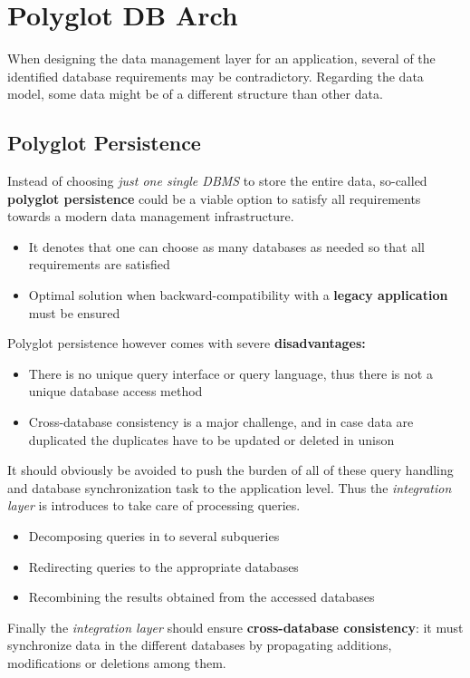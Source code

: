 \chapter{Polyglot DB Arch}
When designing the data management layer for an application, several of the identified database requirements may be contradictory. Regarding the data model, some data might be of a different structure than other data.

\section{Polyglot Persistence}
Instead of choosing \textit{just one single DBMS} to store the entire data, so-called \textbf{polyglot persistence} could be a viable option to satisfy all requirements towards a modern data management infrastructure.
\begin{itemize}
    \item It denotes that one can choose as many databases as needed so that all requirements are satisfied
    \item Optimal solution when backward-compatibility with a \textbf{legacy application} must be ensured
\end{itemize}
Polyglot persistence however comes with severe \textbf{disadvantages:}
\begin{itemize}
    \item There is no unique query interface or query language, thus there is not a unique database access method
    \item Cross-database consistency is a major challenge, and in case data are duplicated the duplicates have to be updated or deleted in unison
\end{itemize}
It should obviously be avoided to push the burden of all of these query handling and database synchronization task to the application level. Thus the \textit{integration layer} is introduces to take
care of processing queries.
\begin{itemize}
    \item Decomposing queries in to several subqueries
    \item Redirecting queries to the appropriate databases
    \item Recombining the results obtained from the accessed databases
\end{itemize}
Finally the \textit{integration layer} should ensure \textbf{cross-database consistency}: it must synchronize data in the different databases by propagating additions, modifications or deletions among them.
